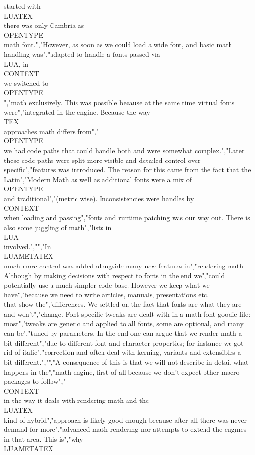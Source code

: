 started with \\LUATEX\\ there was only Cambria as \\OPENTYPE\\ math font.","However, as soon as we could load a wide font, and basic math handling was","adapted to handle a fonts passed via \\LUA, in \\CONTEXT\\ we switched to \\OPENTYPE\\","math exclusively. This was possible because at the same time virtual fonts were","integrated in the engine. Because the way \\TEX\\ approaches math differs from","\\OPENTYPE\\ we had code paths that could handle both and were somewhat complex.","Later these code paths were split more visible and detailed control over specific","features was introduced. The reason for this came from the fact that the Latin","Modern Math as well as additional fonts were a mix of \\OPENTYPE\\ and traditional","(metric wise). Inconsistencies were handles by \\CONTEXT\\ when loading and passing","fonts and runtime patching was our way out. There is also some juggling of math","lists in \\LUA\\ involved.","","In \\LUAMETATEX\\ much more control was added alongside many new features in","rendering math. Although by making decisions with respect to fonts in the end we","could potentially use a much simpler code base. However we keep what we have","because we need to write articles, manuals, presentations etc.\\ that show the","differences. We settled on the fact that fonts are what they are and won't","change. Font specific tweaks are dealt with in a math font goodie file: most","tweaks are generic and applied to all fonts, some are optional, and many can be","tuned by parameters. In the end one can argue that we render math a bit different","due to different font and character properties; for instance we got rid of italic","correction and often deal with kerning, variants and extensibles a bit different.","","A consequence of this is that we will not describe in detail what happens in the","math engine, first of all because we don't expect other macro packages to follow","\\CONTEXT\\ in the way it deals with rendering math and the \\LUATEX\\ kind of hybrid","approach is likely good enough because after all there was never demand for more","advanced math rendering nor attempts to extend the engines in that area. This is","why \\LUAMETATEX\\ 